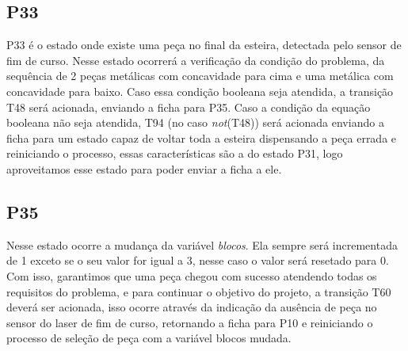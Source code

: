 \documentclass[a4paper,twoside]{articlewithlogo}
\begin{document}
\subsection*{P33} P33 é o estado onde existe uma peça no final da esteira, detectada pelo sensor de fim de curso. Nesse estado ocorrerá a verificação da condição do problema, da sequência de 2 peças metálicas com concavidade para cima e uma metálica com concavidade para baixo. Caso essa condição booleana seja atendida, a transição T48 será acionada, enviando a ficha para P35. Caso a condição da equação booleana não seja atendida, T94 (no caso \textit{not}(T48)) será acionada enviando a ficha para um estado capaz de voltar toda a esteira dispensando a peça errada e reiniciando o processo, essas características são a do estado P31, logo aproveitamos esse estado para poder enviar a ficha a ele.

\subsection*{P35} Nesse estado ocorre a mudança da variável \textit{blocos}. Ela sempre será incrementada de 1 exceto se o seu valor for igual a 3, nesse caso o valor será resetado para 0. Com isso, garantimos que uma peça chegou com sucesso atendendo todas os requisitos do problema, e para continuar o objetivo do projeto, a transição T60 deverá ser acionada, isso ocorre através da indicação da ausência de peça no sensor do laser de fim de curso, retornando a ficha para P10 e reiniciando o processo de seleção de peça com a variável blocos mudada.
\end{document}

